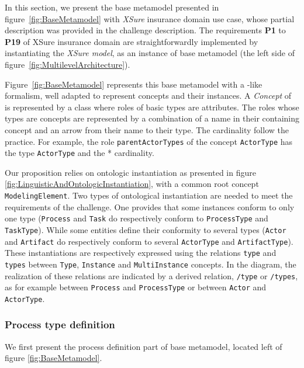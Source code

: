 In this section, we present the base metamodel presented in figure~\ref{fig:BaseMetamodel} with \textit{XSure} insurance domain use case, whose partial description was provided in the challenge description. The requirements \textbf{P1} to \textbf{P19} of XSure insurance domain are straightforwardly implemented by instantiating the \emph{XSure model}, as an instance of base metamodel (the left side of figure~\ref{fig:MultilevelArchitecture}).

Figure~\ref{fig:BaseMetamodel} represents this base metamodel with a \UML-like formalism, well adapted to represent \FML concepts and their instances. A \textit{Concept} of \FML is represented by a \UML class where roles of basic types are attributes. The roles whose types are concepts are represented by a combination of a name in their containing concept and an arrow from their name to their type. The cardinality follow the \UML practice.
For example, the role \texttt{parentActorTypes} of the concept \texttt{ActorType} has the type \texttt{ActorType} and the * cardinality.

Our proposition relies on ontologic instantiation as presented in figure \ref{fig:LinguisticAndOntologicInstantiation}, with a common root concept \texttt{ModelingElement}. Two types of ontological instantiation are needed to meet the requirements of the challenge. One provides that some instances conform to only one type (\texttt{Process} and \texttt{Task} do respectively conform to \texttt{ProcessType} and \texttt{TaskType}). While some entities define their conformity to several types (\texttt{Actor} and \texttt{Artifact} do respectively conform to several \texttt{ActorType} and \texttt{ArtifactType}). These instantiations are respectively expressed using the relations \texttt{type} and \texttt{types} between \texttt{Type}, \texttt{Instance} and \texttt{MultiInstance} concepts. In the diagram, the realization of these relations are indicated by a derived relation, \texttt{/type} or \texttt{/types}, as for example between \texttt{Process} and \texttt{ProcessType} or between \texttt{Actor} and \texttt{ActorType}.

\subsubsection{Process type definition}

We first present the process definition part of base metamodel, located left of figure \ref{fig:BaseMetamodel}.



